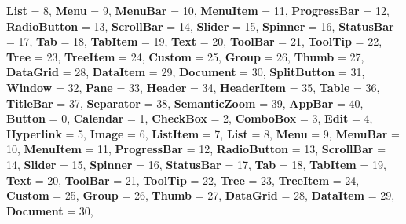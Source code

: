 \begin{DoxyCompactItemize}
\newline
{\bfseries List} = 8, 
{\bfseries Menu} = 9, 
{\bfseries Menu\+Bar} = 10, 
{\bfseries Menu\+Item} = 11, 
\newline
{\bfseries Progress\+Bar} = 12, 
{\bfseries Radio\+Button} = 13, 
{\bfseries Scroll\+Bar} = 14, 
{\bfseries Slider} = 15, 
\newline
{\bfseries Spinner} = 16, 
{\bfseries Status\+Bar} = 17, 
{\bfseries Tab} = 18, 
{\bfseries Tab\+Item} = 19, 
\newline
{\bfseries Text} = 20, 
{\bfseries Tool\+Bar} = 21, 
{\bfseries Tool\+Tip} = 22, 
{\bfseries Tree} = 23, 
\newline
{\bfseries Tree\+Item} = 24, 
{\bfseries Custom} = 25, 
{\bfseries Group} = 26, 
{\bfseries Thumb} = 27, 
\newline
{\bfseries Data\+Grid} = 28, 
{\bfseries Data\+Item} = 29, 
{\bfseries Document} = 30, 
{\bfseries Split\+Button} = 31, 
\newline
{\bfseries Window} = 32, 
{\bfseries Pane} = 33, 
{\bfseries Header} = 34, 
{\bfseries Header\+Item} = 35, 
\newline
{\bfseries Table} = 36, 
{\bfseries Title\+Bar} = 37, 
{\bfseries Separator} = 38, 
{\bfseries Semantic\+Zoom} = 39, 
\newline
{\bfseries App\+Bar} = 40, 
{\bfseries Button} = 0, 
{\bfseries Calendar} = 1, 
{\bfseries Check\+Box} = 2, 
\newline
{\bfseries Combo\+Box} = 3, 
{\bfseries Edit} = 4, 
{\bfseries Hyperlink} = 5, 
{\bfseries Image} = 6, 
\newline
{\bfseries List\+Item} = 7, 
{\bfseries List} = 8, 
{\bfseries Menu} = 9, 
{\bfseries Menu\+Bar} = 10, 
\newline
{\bfseries Menu\+Item} = 11, 
{\bfseries Progress\+Bar} = 12, 
{\bfseries Radio\+Button} = 13, 
{\bfseries Scroll\+Bar} = 14, 
\newline
{\bfseries Slider} = 15, 
{\bfseries Spinner} = 16, 
{\bfseries Status\+Bar} = 17, 
{\bfseries Tab} = 18, 
\newline
{\bfseries Tab\+Item} = 19, 
{\bfseries Text} = 20, 
{\bfseries Tool\+Bar} = 21, 
{\bfseries Tool\+Tip} = 22, 
\newline
{\bfseries Tree} = 23, 
{\bfseries Tree\+Item} = 24, 
{\bfseries Custom} = 25, 
{\bfseries Group} = 26, 
\newline
{\bfseries Thumb} = 27, 
{\bfseries Data\+Grid} = 28, 
{\bfseries Data\+Item} = 29, 
{\bfseries Document} = 30, 
\newline

\end{DoxyCompactItemize}
